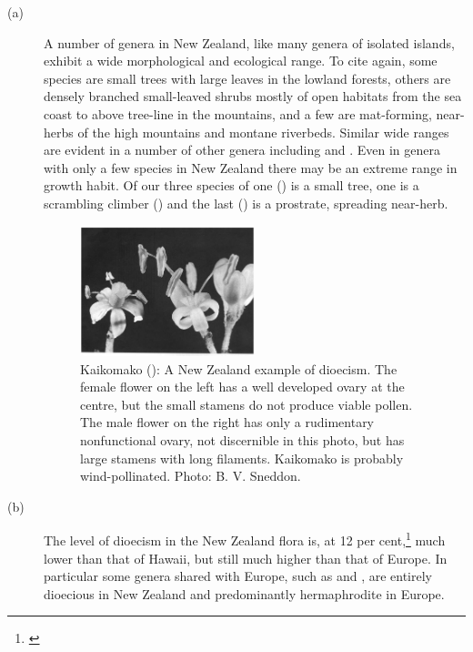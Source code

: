 \begin{description}
\item[{(a)}]A number of genera in New Zealand, like many genera of isolated islands, exhibit a wide morphological and ecological range.
To cite  again, some species are small trees with large leaves in the lowland forests, others are densely branched small-leaved shrubs mostly of open habitats from the sea coast to above tree-line in the mountains, and a few are mat-forming, near-herbs of the high mountains and montane riverbeds.
Similar wide ranges are evident in a number of other genera including  and .
Even in genera with only a few species in New Zealand there may be an extreme range in growth habit.
Of our three species of  one () is a small tree, one is a scrambling climber () and the last () is a prostrate, spreading near-herb.
\begin{figure}
	\includegraphics[width=0.5\textwidth]{graphics/figure4kaikomako.jpg}
	\centering
	\caption[Kaikomako: A New Zealand example of dioecism]{Kaikomako (): A New Zealand example of dioecism.
    The female flower on the left has a well developed ovary at the centre, but the small stamens do not produce viable pollen.
    The male flower on the right has only a rudimentary nonfunctional ovary, not discernible in this photo, but has large stamens with long filaments.
    Kaikomako is probably wind-pollinated.
    Photo: B. V. Sneddon.}
	\label{fig:4kaikomako}
\end{figure}
\item[{(b)}]The level of dioecism in the New Zealand flora is, at 12 per cent,\footnote{\cite{godley1979flower}} much lower than that of Hawai{\okina}i, but still much higher than that of Europe.
In particular some genera shared with Europe, such as  and , are entirely dioecious in New Zealand and predominantly hermaphrodite in Europe.

\end{description}
